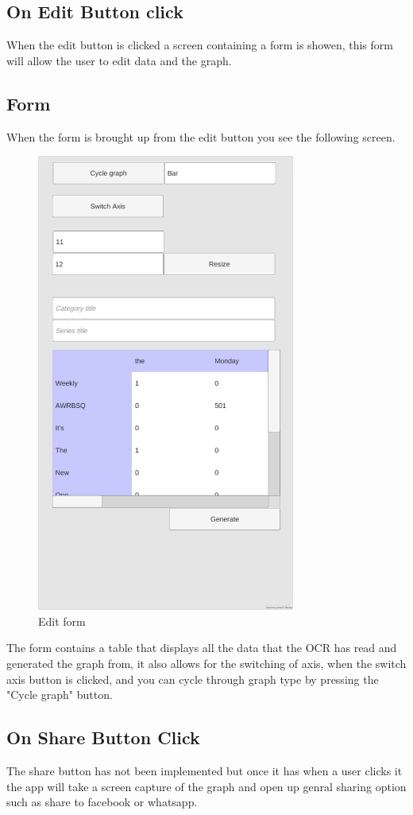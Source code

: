 \documentclass[a4paper,12pt]{article}
\begin{document}
\subsection{On Edit Button click}
When the edit button is clicked a screen containing a form is showen, this form will allow the user to edit data and the graph. 
\subsection{Form}
When the form is brought up from the edit button you see the following screen. 
\begin{figure}[H] 
\centering
    \includegraphics[width=85mm]{images/form.jpg}
    \caption{Edit form}
\end{figure}
The form contains a table that displays all the data that the OCR has read and generated the graph from, it also allows for the switching of axis, when the switch axis button is clicked, and you can cycle through graph type by pressing the "Cycle graph" button. 


\subsection{On Share Button Click}
The share button has not been implemented but once it has when a user clicks it the app will take a screen capture of the graph and open up genral sharing option such as share to facebook or whatsapp.
\end{document}
